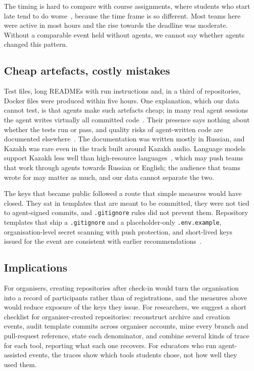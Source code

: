 \documentclass{article}
\begin{document}
The timing is hard to compare with course assignments, where students who start late tend to do worse~\cite{edwards2009behaviors,kazerouni2017procrastination}, because the time frame is so different. Most teams here were active in most hours and the rise towards the deadline was moderate. Without a comparable event held without agents, we cannot say whether agents changed this pattern.

\subsection{Cheap artefacts, costly mistakes}
Test files, long READMEs with run instructions and, in a third of repositories, Docker files were produced within five hours. One explanation, which our data cannot test, is that agents make such artefacts cheap; in many real agent sessions the agent writes virtually all committed code~\cite{baumann2026swechat}. Their presence says nothing about whether the tests run or pass, and quality risks of agent-written code are documented elsewhere~\cite{he2026cursor,zhao2025vibesafe,deng2026vibeinsecurity}. The documentation was written mostly in Russian, and Kazakh was rare even in the track built around Kazakh audio. Language models support Kazakh less well than high-resource languages~\cite{togmanov2025kazmmlu}, which may push teams that work through agents towards Russian or English; the audience that teams wrote for may matter as much, and our data cannot separate the two.

The keys that became public followed a route that simple measures would have closed. They sat in templates that are meant to be committed, they were not tied to agent-signed commits, and \texttt{.gitignore} rules did not prevent them. Repository templates that ship a \texttt{.gitignore} and a placeholder-only \texttt{.env.example}, organisation-level secret scanning with push protection, and short-lived keys issued for the event are consistent with earlier recommendations~\cite{meli2019git,krause2022pushed,basak2023tools}.

\subsection{Implications}
For organisers, creating repositories after check-in would turn the organisation into a record of participants rather than of registrations, and the measures above would reduce exposure of the keys they issue. For researchers, we suggest a short checklist for organiser-created repositories: reconstruct archive and creation events, audit template commits across organiser accounts, mine every branch and pull-request reference, state each denominator, and combine several kinds of trace for each tool, reporting what each one recovers. For educators who run agent-assisted events, the traces show which tools students chose, not how well they used them.
\end{document}
